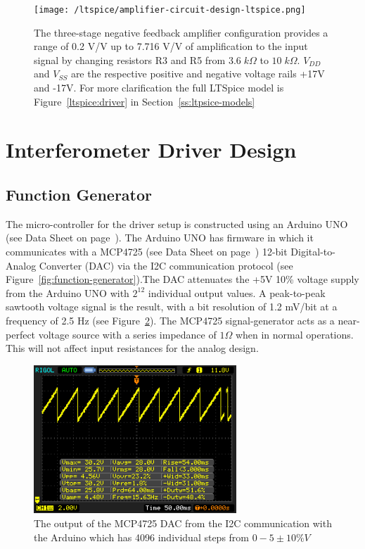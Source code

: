 \documentclass[12pt,journal]{IEEEtran}
\begin{document}
\begin{figure}[tb]
  \centering
	\texttt{[image: /ltspice/amplifier-circuit-design-ltspice.png]}
	\caption[Cavity Mounts]{The three-stage negative feedback amplifier configuration provides a range of 0.2 V/V up to 7.716 V/V of amplification to the input signal by changing resistors R3 and R5 from $3.6\;k\Omega$ to $10\;k\Omega$. $V_{DD}$ and $V_{SS}$ are the respective positive and negative voltage rails +17V and -17V. For more clarification the full LTSpice model is Figure~\ref{ltspice:driver} in Section~\ref{ss:ltpsice-models}}
	\label{fig:amplifier-configuration}
\end{figure}

\section{Interferometer Driver Design}

\subsection{Function Generator}
The micro-controller for the driver setup is constructed using an Arduino UNO (see Data Sheet on page~\pageref{datasheet:arduino_uno}). The Arduino UNO has firmware in which it communicates with a MCP4725 (see Data Sheet on page~\pageref{datasheet:mcp4725}) 12-bit Digital-to-Analog Converter (DAC) via the I2C communication protocol (see Figure~\ref{fig:function-generator}).The DAC attenuates the +5V 10\% voltage supply from the Arduino UNO with $2^12$ individual output values. A peak-to-peak sawtooth voltage signal is the result, with a bit resolution of 1.2 mV/bit at a frequency of 2.5 Hz (see Figure~\ref{fig:five-volts-15-hz-wave}). The MCP4725 signal-generator acts as a near-perfect voltage source with a series impedance of $1\Omega$ when in normal operations. This will not affect input resistances for the analog design.  

\begin{figure}[h!]
  \centering
	\includegraphics[width=3in]{./data/dac-output-waveform.png}
	\caption[Cavity Mounts]{The output of the MCP4725 DAC from the I2C communication with the Arduino which has 4096 individual steps from $0-5 \pm 10\% V$}
	\label{fig:five-volts-15-hz-wave}
\end{figure}
\end{document}
